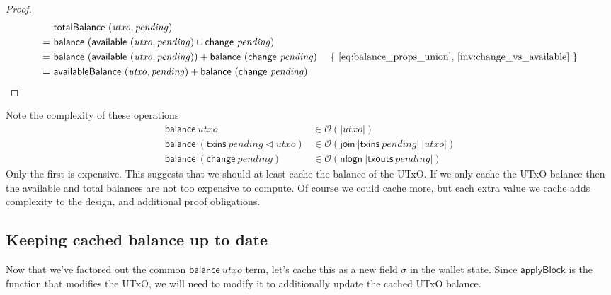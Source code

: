 \documentclass{article}
\newcommand{\order}[1]{\mathcal{O}\left(#1\right)}
\newcommand{\restrictdom}{\lhd}
\theoremstyle{definition}{
  \newtheorem{lemma}{Lemma}[section] %
  \newtheorem{definition}[lemma]{Definition}
}
\theoremstyle{theorem}{
  \newtheorem{invariant}[lemma]{Invariant}
  \newtheorem{proofobligation}[lemma]{Proof Obligation}
}
\numberwithin{equation}{lemma}
\begin{document}
\begin{proof}
\begin{align*}
   & ~ \mathsf{totalBalance} ~ (\mathit{utxo}, \mathit{pending}) \\
 = & ~ \mathsf{balance} ~ (\mathsf{available} ~ (\mathit{utxo}, \mathit{pending}) \cup \mathsf{change} ~ \mathit{pending}) \\
 = & ~ \mathsf{balance} ~ (\mathsf{available} ~ (\mathit{utxo}, \mathit{pending}))
     + \mathsf{balance} ~ (\mathsf{change} ~ \mathit{pending})
   & \text{ \{ \eqref{eq:balance_props_union}, \cref{inv:change_vs_available} \}} \\
=  & ~ \mathsf{availableBalance} ~ (\mathit{utxo}, \mathit{pending}) + \mathsf{balance} ~ (\mathsf{change} ~ \mathit{pending})
\end{align*}
\end{proof}

Note the complexity of these operations
%
\begin{equation*}
\begin{split}
\mathsf{balance} ~ utxo & \in \order{|utxo|} \\
\mathsf{balance} ~ (\mathsf{txins} ~ \mathit{pending} \restrictdom utxo) & \in \order{\mathsf{join} ~ |\mathsf{txins}~ \mathit{pending}| ~ |utxo|} \\
\mathsf{balance} ~ (\mathsf{change} ~ \mathit{pending}) & \in \order{\mathsf{nlogn} ~ |\mathsf{txouts}~ \mathit{pending}|}
\end{split}
\end{equation*}
%
Only the first is expensive. This suggests that we should at least cache the
balance of the UTxO. If we only cache the UTxO balance then the available and total
balances are not too expensive to compute. Of course we could cache more, but
each extra value we cache adds complexity to the design, and additional proof
obligations.

\subsection{Keeping cached balance up to date}
\label{sec:applyBlock_incr}

Now that we've factored out the common $\mathsf{balance} ~ \mathit{utxo}$
term, let's cache this as a new field $\sigma$ in the wallet state. Since
$\mathsf{applyBlock}$ is the function that modifies the UTxO, we will
need to modify it to additionally update the cached UTxO balance.
\end{document}
